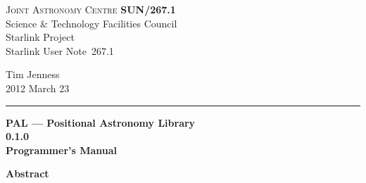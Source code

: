 \documentclass[twoside,11pt]{article}
\newcommand{\stardoccategory}  {Starlink User Note}
\newcommand{\stardocinitials}  {SUN}
\newcommand{\stardocnumber}    {267.1}
\newcommand{\stardocauthors}   {Tim Jenness}
\newcommand{\stardocdate}      {2012 March 23}
\newcommand{\stardoctitle}     {PAL --- Positional Astronomy Library}
\newcommand{\stardocversion}   {0.1.0}
\newcommand{\stardocmanual}    {Programmer's Manual}
\newcommand{\stardocname}{\stardocinitials /\stardocnumber}
\newenvironment{latexonly}{}{}
\renewcommand{\_}{\texttt{\symbol{95}}}
\begin{document}
\thispagestyle{empty}

\begin{latexonly}
   \textsc{Joint Astronomy Centre} \hfill \textbf{\stardocname}\\
   {\large Science \& Technology Facilities Council}\\
   {\large Starlink Project\\}
   {\large \stardoccategory\ \stardocnumber}
   \begin{flushright}
   \stardocauthors\\
   \stardocdate
   \end{flushright}
   \vspace{-4mm}
   \rule{\textwidth}{0.5mm}
   \vspace{5mm}
   \begin{center}
   {\Huge\textbf{\stardoctitle \\ [2.5ex]}}
   {\LARGE\textbf{\stardocversion \\ [4ex]}}
   {\Huge\textbf{\stardocmanual}}
   \end{center}
   \vspace{5mm}


   \vspace{10mm}
   \begin{center}
      {\Large\textbf{Abstract}}
   \end{center}
\end{latexonly}
\end{document}
